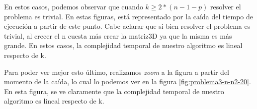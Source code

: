 En estos casos, podemos observar que cuando $k \geq 2*(n-1-p)$ resolver el problema es trivial. En estas figuras, está representado por la caída del tiempo de ejecución a partir de este punto. Cabe aclarar que si bien resolver el problema es trivial, al crecer el n cuesta más crear la matriz3D ya que la misma es más grande. En estos casos, la complejidad temporal de nuestro algoritmo es lineal respecto de k.

Para poder ver mejor esto último, realizamos \emph{zoom} a la figura a partir del momento de la caída, lo cual lo podemos ver en la figura \ref{fig:problema3-n-n2-20}. En esta figura, se ve claramente que la complejidad temporal de nuestro algoritmo es lineal respecto de k.

